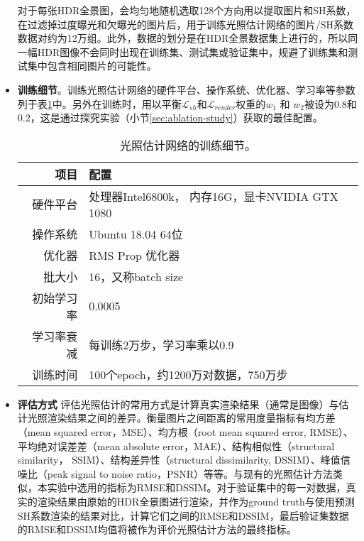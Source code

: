 \begin{itemize}
    对于每张HDR全景图，会均匀地随机选取128个方向用以提取图片和SH系数，在过滤掉过度曝光和欠曝光的图片后，用于训练光照估计网络的图片/SH系数数据对约为12万组。此外，数据的划分是在HDR全景数据集上进行的，所以同一幅HDR图像不会同时出现在训练集、测试集或验证集中，规避了训练集和测试集中包含相同图片的可能性。
    \item \textbf{训练细节}。训练光照估计网络的硬件平台、操作系统、优化器、学习率等参数列于表\ref{table:traning-details}中。另外在训练时，用以平衡$\mathcal{L}_{sh}$和$\mathcal{L}_{render}$权重的$w_1$ 和 $w_2$被设为0.8和0.2，这是通过探究实验（小节\ref{sec:ablation-study}）获取的最佳配置。
    \begin{table}[htbp]
        \centering
        \caption{
            \label{table:traning-details}
            光照估计网络的训练细节。
        }
        \begin{tabular}{r|l}
            \hline
            项目 & 配置\\
            \hline
            硬件平台 & 处理器Intel6800k， 内存16G，显卡NVIDIA GTX 1080\\
            操作系统 & Ubuntu 18.04 64位\\
            优化器    & RMS Prop 优化器\\
            批大小    & 16，又称batch size\\
            初始学习率 & 0.0005 \\
            学习率衰减 & 每训练2万步，学习率乘以0.9\\
            训练时间 & 100个epoch，约1200万对数据，750万步\\
            \hline            
        \end{tabular}
    \end{table}
    \item \textbf{评估方式} 评估光照估计的常用方式是计算真实渲染结果（通常是图像）与估计光照渲染结果之间的差异。衡量图片之间距离的常用度量指标有均方差（mean squared error，MSE）、均方根（root mean squared error, RMSE）、平均绝对误差差（mean absolute  error，MAE）、结构相似性（structural similarity， SSIM）、结构差异性（structural dissimilarity, DSSIM）、峰值信噪比（peak signal to noise ratio，PSNR）等等。与现有的光照估计方法类似，本实验中选用的指标为RMSE和DSSIM。对于验证集中的每一对数据，真实的渲染结果由原始的HDR全景图进行渲染，并作为ground truth与使用预测SH系数渲染的结果对比，计算它们之间的RMSE和DSSIM，最后验证集数据的RMSE和DSSIM均值将被作为评价光照估计方法的最终指标。
\end{itemize}
